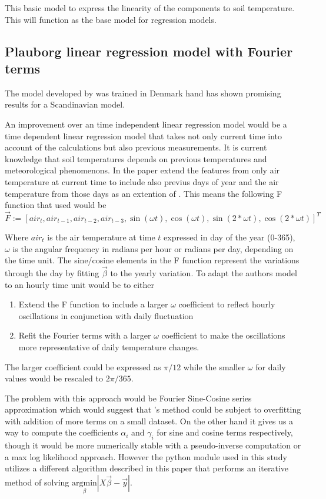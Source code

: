 This basic model to express the linearity of the components to soil temperature. This will function as the base model for regression models. 

\subsection[Plauborg Regression]{Plauborg linear regression model with Fourier terms}\label{sec:theory:pluborg}
The model developed by \cite{plauborg_simple_2002} was trained in Denmark hand has shown promising results for a Scandinavian model. 

An improvement over an time independent linear regression model would be a time dependent linear regression model that takes not only current time into account of the calculations but also previous measurements. It is current knowledge that soil temperatures depends on previous temperatures and meteorological phenomenons. In the paper \citeauthor{plauborg_simple_2002} \cite{plauborg_simple_2002} extend the features from only air temperature at current time to include also previus days of year and the air temperature from those days as an extention of \cite{roodenburg_estimating_1985}. This means the following F function that \citeauthor{plauborg_simple_2002} used would be 
$$
\vec{F} := [air_t , air_{t-1}, air_{t-2}, air_{t-3}, \sin(\omega t) , \cos(\omega t), \sin(2*\omega t), \cos(2*\omega t)]^T
$$

Where $air_t$ is the air temperature at time $t$ expressed in day of the year (0-365), $\omega$ is the angular frequency in radians per hour or radians per day, depending on the time unit. The sine/cosine elements in the F function represent the variations through the day by fitting $\vec{\beta}$ to the yearly variation. To adapt the authors model to an hourly time unit would be to either
\begin{enumerate}
	\item Extend the F function to include a larger $\omega$ coefficient to reflect hourly oscillations in conjunction with daily fluctuation
	\item Refit the Fourier terms with a larger $\omega$ coefficient to make the oscillations more representative of daily temperature changes.
\end{enumerate}

The larger coefficient could be expressed as $\pi/12$ while the smaller $\omega$ for daily values would be rescaled to $2\pi/365$.

The problem with this approach would be Fourier Sine-Cosine series approximation which would suggest that \citeauthor{plauborg_simple_2002}'s method could be subject to overfitting with addition of more terms on a small dataset. On the other hand it gives us a way to compute the coefficients $\alpha_i$ and $\gamma_i$ for sine and cosine terms respectively, though it would be more numerically stable with a pseudo-inverse computation or a max log likelihood approach. However the python module used in this study utilizes a different algorithm described in this paper \cite{van_benthem_fast_2004} that performs an iterative method of solving $\underset{\beta}{\text{argmin}} \left|X\vec{\beta} - \vec{y}\right|$.

